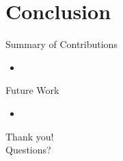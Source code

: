 \documentclass{beamer}
\begin{document}
\section{Conclusion}

\begin{frame}{Summary of Contributions}
  \begin{itemize}
    \item 
  \end{itemize}
\end{frame}

\begin{frame}{Future Work}
  \begin{itemize}
    \item 
  \end{itemize}
\end{frame}

\begin{frame}
  \centering
  \Huge Thank you!\\
  \vspace{0.5cm}
  \Large Questions?
\end{frame}
\end{document}
